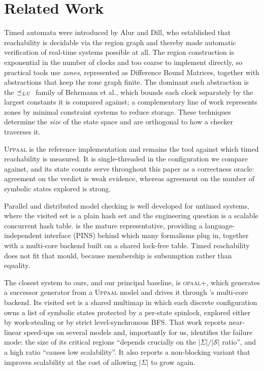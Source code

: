 \section{Related Work}\label{sec:related}

Timed automata were introduced by Alur and Dill, who established that reachability is
decidable via the region graph and thereby made automatic verification of real-time systems
possible at all. The region construction is exponential in the number of clocks and too
coarse to implement directly, so practical tools use \emph{zones}, represented as Difference
Bound Matrices, together with abstractions that keep the zone graph finite. The dominant such
abstraction is the $\preceq_{\mathit{LU}}{}$ family of Behrmann et al., which bounds each clock separately by
the largest constants it is compared against; a complementary line of work represents zones by
minimal constraint systems to reduce storage. These techniques determine the \emph{size} of
the state space and are orthogonal to how a checker traverses it.

\textsc{Uppaal} is the reference implementation and remains the tool against which timed
reachability is measured. It is single-threaded in the configuration we compare against, and
its state counts serve throughout this paper as a correctness oracle: agreement on the verdict
is weak evidence, whereas agreement on the number of symbolic states explored is strong.

Parallel and distributed model checking is well developed for untimed systems, where the
visited set is a plain hash set and the engineering question is a scalable concurrent hash
table. \ltsmin{} is the mature representative, providing a language-independent interface
(PINS) behind which many formalisms plug in, together with a multi-core backend built on a
shared lock-free table. Timed reachability does not fit that mould, because membership is
subsumption rather than equality.

The closest system to ours, and our principal baseline, is \textsc{opaal}+\ltsmin{}, which
generates a successor generator from a \textsc{Uppaal} model and drives it through \ltsmin{}'s
multi-core backend. Its visited set is a shared multimap in which each discrete configuration
owns a list of symbolic states protected by a per-state spinlock, explored either by
work-stealing or by strict level-synchronous BFS. That work reports near-linear speed-ups on
several models and, importantly for us, identifies the failure mode: the size of its critical
regions ``depends crucially on the $|\Sigma|/|\mathcal{S}|$ ratio'', and a high ratio ``causes
low scalability''. It also reports a non-blocking variant that improves scalability at the
cost of allowing $|\Sigma|$ to grow again.


